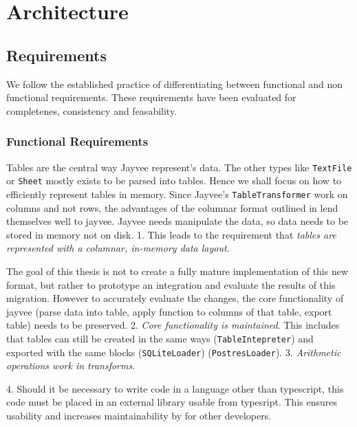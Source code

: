 \chapter{Architecture}
\label{chapter:Architecture}

\section{Requirements}
\label{section:Requirements}

We follow the established practice of differentiating between functional and non functional requirements.
These requirements have been evaluated for completenes, consistency and feasability.

\subsection{Functional Requirements}
\label{subsection:FunctionalRequirements}

Tables are the central way Jayvee represent's data.
The other types like \Verb|TextFile| or \Verb|Sheet| mostly exists to be parsed into tables.
Hence %
we shall focus on how to efficiently represent tables in memory.
Since Jayvee's \Verb|TableTransformer| work on columns and not rows, the advantages of the columnar format outlined in %
lend themselves well to jayvee.
Jayvee needs manipulate the data, so data needs to be stored in memory not on disk.
1. This leads to the requirement that \emph{tables are represented with a columnar, in-memory data layout}.

The goal of this thesis is not to create a fully mature implementation of this new format, but rather to prototype an integration and evaluate the results of this migration.
However to accurately evaluate the changes, the core functionality of jayvee (parse data into table, apply function to columns of that table, export table) needs to be preserved.
2. \emph{Core functionality is maintained}.
This includes that tables can still be created in the same ways (\Verb|TableIntepreter|) and exported with the same blocks (\Verb|SQLiteLoader|) (\Verb|PostresLoader|).
3. \emph{Arithmetic operations work in transforms}.

4. Should it be necessary to write code in a language other than typescript, this code must be placed in an external library usable from typesript.
This ensures usability and increases maintainability by for other developers.


